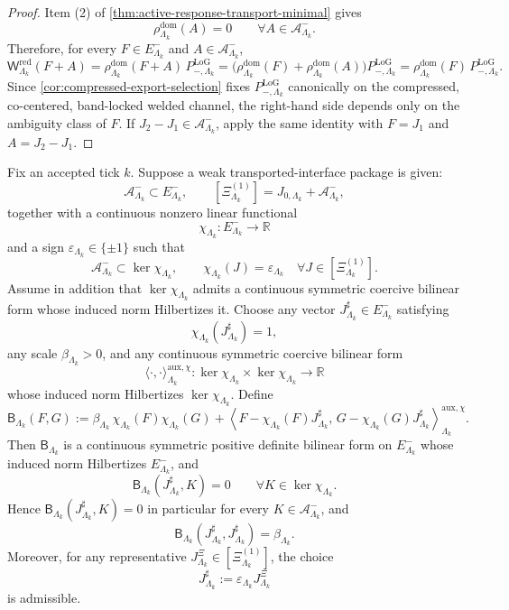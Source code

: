 \documentclass[11pt]{article}
\begin{document}
\begin{proof}
Item (2) of \cref{thm:active-response-transport-minimal} gives
\[
\rho^{\mathrm{dom}}_{\Lambda_k}(A)=0
\qquad
\forall A\in\mathcal A^-_{\Lambda_k}.
\]
Therefore, for every \(F\in E^-_{\Lambda_k}\) and \(A\in\mathcal A^-_{\Lambda_k}\),
\[
\mathsf W^{\mathrm{red}}_{\Lambda_k}(F+A)
=
\rho^{\mathrm{dom}}_{\Lambda_k}(F+A)\,P_{-,\Lambda_k}^{\mathrm{LoG}}
=
\big(\rho^{\mathrm{dom}}_{\Lambda_k}(F)+\rho^{\mathrm{dom}}_{\Lambda_k}(A)\big)
P_{-,\Lambda_k}^{\mathrm{LoG}}
=
\rho^{\mathrm{dom}}_{\Lambda_k}(F)\,P_{-,\Lambda_k}^{\mathrm{LoG}}.
\]
Since \cref{cor:compressed-export-selection} fixes \(P_{-,\Lambda_k}^{\mathrm{LoG}}\) canonically on
the compressed, co-centered, band-locked welded channel, the right-hand side depends only on the
ambiguity class of \(F\).
If \(J_2-J_1\in\mathcal A^-_{\Lambda_k}\), apply the same identity with \(F=J_1\) and
\(A=J_2-J_1\).
\end{proof}

\begin{proposition}
\label{prop:minimal-transport-calibration}
Fix an accepted tick \(k\). Suppose a weak transported-interface package is given:
\[
\mathcal A^-_{\Lambda_k}\subset E^-_{\Lambda_k},
\qquad
[\Xi^{(1)}_{\Lambda_k}]=J_{0,\Lambda_k}+\mathcal A^-_{\Lambda_k},
\]
together with a continuous nonzero linear functional
\[
\chi_{\Lambda_k}:E^-_{\Lambda_k}\to\mathbb R
\]
and a sign
\(
\varepsilon_{\Lambda_k}\in\{\pm1\}
\)
such that
\[
\mathcal A^-_{\Lambda_k}\subset\ker\chi_{\Lambda_k},
\qquad
\chi_{\Lambda_k}(J)=\varepsilon_{\Lambda_k}
\quad
\forall J\in[\Xi^{(1)}_{\Lambda_k}].
\]
Assume in addition that \(\ker\chi_{\Lambda_k}\) admits a continuous symmetric coercive bilinear form
whose induced norm Hilbertizes it.
Choose any vector \(J^\sharp_{\Lambda_k}\in E^-_{\Lambda_k}\) satisfying
\[
\chi_{\Lambda_k}(J^\sharp_{\Lambda_k})=1,
\]
any scale \(\beta_{\Lambda_k}>0\), and any continuous symmetric coercive bilinear form
\[
\langle\cdot,\cdot\rangle^{\mathrm{aux},\chi}_{\Lambda_k}
:
\ker\chi_{\Lambda_k}\times\ker\chi_{\Lambda_k}\to\mathbb R
\]
whose induced norm Hilbertizes \(\ker\chi_{\Lambda_k}\).
Define
\begin{equation}
\mathsf B_{\Lambda_k}(F,G)
:=
\beta_{\Lambda_k}\,\chi_{\Lambda_k}(F)\chi_{\Lambda_k}(G)
+
\left\langle
F-\chi_{\Lambda_k}(F)J^\sharp_{\Lambda_k},
\,
G-\chi_{\Lambda_k}(G)J^\sharp_{\Lambda_k}
\right\rangle^{\mathrm{aux},\chi}_{\Lambda_k}.
\label{eq:B-minimal-transport}
\end{equation}
Then \(\mathsf B_{\Lambda_k}\) is a continuous symmetric positive definite bilinear form on
\(E^-_{\Lambda_k}\) whose induced norm Hilbertizes \(E^-_{\Lambda_k}\), and
\[
\mathsf B_{\Lambda_k}(J^\sharp_{\Lambda_k},K)=0
\qquad
\forall K\in\ker\chi_{\Lambda_k}.
\]
Hence \(\mathsf B_{\Lambda_k}(J^\sharp_{\Lambda_k},K)=0\) in particular for every
\(K\in\mathcal A^-_{\Lambda_k}\), and
\[
\mathsf B_{\Lambda_k}(J^\sharp_{\Lambda_k},J^\sharp_{\Lambda_k})
=
\beta_{\Lambda_k}.
\]
Moreover, for any representative \(J^\Xi_{\Lambda_k}\in[\Xi^{(1)}_{\Lambda_k}]\), the choice
\[
J^\sharp_{\Lambda_k}:=\varepsilon_{\Lambda_k}J^\Xi_{\Lambda_k}
\]
is admissible.
\end{proposition}
\end{document}
